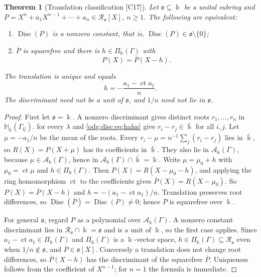 \documentclass[11pt,oneside]{article}
\numberwithin{equation}{section}
\newtheorem{theorem}{Theorem}[section]
\theoremstyle{definition}
\theoremstyle{remark}
\newcommand{\Q}{\mathbb Q}
\newcommand{\ct}{\operatorname{ct}}
\newcommand{\src}[1]{\textup{\textsf{\small[#1]}}}
\newcommand{\crA}{\mathcal A_\Bbbk(\Gamma)}
\newcommand{\crP}{\Pi_\Bbbk(\Gamma)}
\newcommand{\Disc}{\operatorname{Disc}}
\newcommand{\Hbar}{\mathbb H_{\bar\Bbbk}(\Gamma_\Q)}
\begin{document}
\begin{theorem}[Translation classification \src{C17}]\label{odg:disc:thm:translation}
Let $\mathfrak o\subseteq\Bbbk$ be a unital subring and
$P=X^n+a_1X^{n-1}+\cdots+a_n\in\mathcal R_{\mathfrak o}[X]$, $n\ge1$. The following are
equivalent:
\begin{enumerate}[label=\textup{(\roman*)},leftmargin=*]
\item $\Disc(P)$ is a nonzero constant, that is, $\Disc(P)\in\mathfrak o\setminus\{0\}$;
\item $\overline P$ is squarefree and there is $h\in\crP$ with
\begin{equation}\label{odg:disc:eq:translation}
 P(X)=\overline P(X-h).
\end{equation}
\end{enumerate}
The translation is unique and equals
\begin{equation}\label{odg:disc:eq:h}
 h=-\frac{a_1-\ct a_1}{n}.
\end{equation}
The discriminant need not be a unit of $\mathfrak o$, and $1/n$ need not lie in
$\mathfrak o$.
\end{theorem}
\begin{proof}
First let $\mathfrak o=\Bbbk$. A nonzero discriminant gives distinct roots
$r_1,\ldots,r_n$ in $\Hbar$.  for every $\lambda$ and
\eqref{odg:disc:eq:hahn} give $r_i-r_j\in\bar\Bbbk$ for all $i,j$. Let $\mu=-a_1/n$ be the
mean of the roots. Every $r_i-\mu=n^{-1}\sum_j(r_i-r_j)$ lies in $\bar\Bbbk$, so
$R(X)=P(X+\mu)$ has its coefficients in $\bar\Bbbk$. They also lie in $\crA$, because
$\mu\in\crA$, hence in $\crA\cap\bar\Bbbk=\Bbbk$. Write $\mu=\mu_0+h$ with $\mu_0=\ct\mu$
and $h\in\crP$. Then $P(X)=R(X-\mu_0-h)$, and applying the ring homomorphism $\ct$ to the
coefficients gives $\overline P(X)=R(X-\mu_0)$. So $P(X)=\overline P(X-h)$ and
$h=-(a_1-\ct a_1)/n$. Translation preserves root differences, so
$\Disc(\overline P)=\Disc(P)\ne0$; hence $\overline P$ is squarefree over $\Bbbk$.

For general $\mathfrak o$, regard $P$ as a polynomial over $\crA$. A nonzero constant
discriminant lies in $\mathcal R_{\mathfrak o}\cap\Bbbk=\mathfrak o$ and is a unit of
$\Bbbk$, so the first case applies. Since $a_1-\ct a_1\in\crP$ and $\crP$ is a
$\Bbbk$-vector space, $h\in\crP\subseteq\mathcal R_{\mathfrak o}$ even when
$1/n\notin\mathfrak o$, and $\overline P\in\mathfrak o[X]$. Conversely a translation does
not change root differences, so $\overline P(X-h)$ has the discriminant of the squarefree
$\overline P$. Uniqueness follows from the coefficient of $X^{n-1}$; for $n=1$ the formula
is immediate.
\end{proof}
\end{document}
